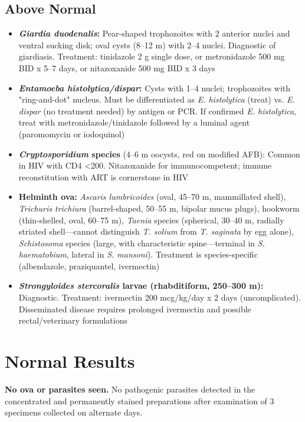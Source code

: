 \subsection*{Above Normal}
\begin{itemize}
  \item \textbf{\textit{Giardia duodenalis}:} Pear-shaped trophozoites with 2 anterior nuclei and ventral sucking disk; oval cysts (8--12 \textmu m) with 2--4 nuclei. Diagnostic of giardiasis. Treatment: tinidazole 2 g single dose, or metronidazole 500 mg BID x 5--7 days, or nitazoxanide 500 mg BID x 3 days
  \item \textbf{\textit{Entamoeba histolytica/dispar}:} Cysts with 1--4 nuclei; trophozoites with "ring-and-dot" nucleus. Must be differentiated as \textit{E. histolytica} (treat) vs. \textit{E. dispar} (no treatment needed) by antigen or PCR. If confirmed \textit{E. histolytica}, treat with metronidazole/tinidazole followed by a luminal agent (paromomycin or iodoquinol)
  \item \textbf{\textit{Cryptosporidium} species} (4--6 \textmu m oocysts, red on modified AFB): Common in HIV with CD4 <200. Nitazoxanide for immunocompetent; immune reconstitution with ART is cornerstone in HIV
  \item \textbf{Helminth ova:} \textit{Ascaris lumbricoides} (oval, 45--70 \textmu m, mammillated shell), \textit{Trichuris trichiura} (barrel-shaped, 50--55 \textmu m, bipolar mucus plugs), hookworm (thin-shelled, oval, 60--75 \textmu m), \textit{Taenia} species (spherical, 30--40 \textmu m, radially striated shell---cannot distinguish \textit{T. solium} from \textit{T. saginata} by egg alone), \textit{Schistosoma} species (large, with characteristic spine---terminal in \textit{S. haematobium}, lateral in \textit{S. mansoni}). Treatment is species-specific (albendazole, praziquantel, ivermectin)
  \item \textbf{\textit{Strongyloides stercoralis} larvae (rhabditiform, 250--300 \textmu m):} Diagnostic. Treatment: ivermectin 200 mcg/kg/day x 2 days (uncomplicated). Disseminated disease requires prolonged ivermectin and possible rectal/veterinary formulations
\end{itemize}

\section*{Normal Results}
\textbf{No ova or parasites seen.} No pathogenic parasites detected in the concentrated and permanently stained preparations after examination of 3 specimens collected on alternate days.

